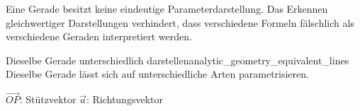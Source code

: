 \label{subsec:analytic_geometry_equivalent_line_representations}

Eine Gerade besitzt keine eindeutige Parameterdarstellung. Das Erkennen
gleichwertiger Darstellungen verhindert, dass verschiedene Formeln
fälschlich als verschiedene Geraden interpretiert werden.

\begin{ExampleBox}{Dieselbe Gerade unterschiedlich darstellen}{analytic_geometry_equivalent_lines}
  Dieselbe Gerade lässt sich auf unterschiedliche Arten parametrisieren.

  \begin{center}
    \textcolor{olive!80!black}{$\overrightarrow{OP}$: Stützvektor}
    \qquad
    \textcolor{THMBlue}{$\vec a$: Richtungsvektor}
  \end{center}


\end{ExampleBox}
